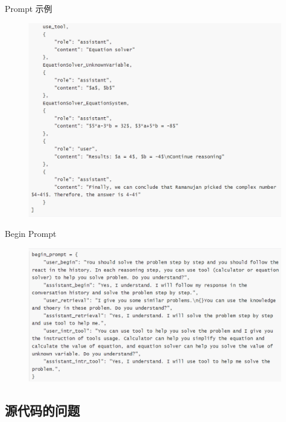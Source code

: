 \begin{frame}{Prompt 示例}
    \begin{figure}
        \centering
        \includegraphics[width=.5\linewidth]{./pic/3.png}
    \end{figure}
\end{frame}

\begin{frame}{Begin Prompt}
    \begin{figure}
        \centering
        \includegraphics[width=.7\linewidth]{./pic/4.png}
    \end{figure}
\end{frame}

\subsection{源代码的问题}

